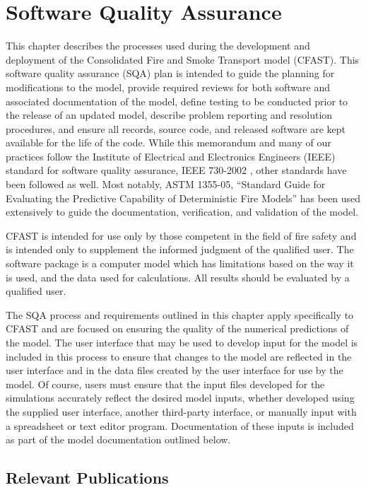 
\chapter{Software Quality Assurance}

This chapter describes the processes used during the development and deployment of the Consolidated Fire and Smoke Transport model (CFAST).  This software quality assurance (SQA) plan is intended to guide the planning for modifications to the model, provide required reviews for both software and associated documentation of the model, define testing to be conducted prior to the release of an updated model, describe problem reporting and resolution procedures, and ensure all records, source code, and released software are kept available for the life of the code.  While this memorandum and many of our practices follow the Institute of Electrical and Electronics Engineers (IEEE) standard for software quality assurance, IEEE 730-2002 \cite{IEEE:730}, other standards have been followed as well.  Most notably, ASTM 1355-05, ``Standard Guide for Evaluating the Predictive Capability of Deterministic Fire Models'' \cite{ASTM:E1355} has been used extensively to guide the documentation, verification, and validation of the model.

CFAST is intended for use only by those competent in the field of fire safety and is intended only to supplement the informed judgment of the qualified user. The software package is a computer model which has limitations based on the way it is used, and the data used for calculations. All results should be evaluated by a qualified user.

The SQA process and requirements outlined in this chapter apply specifically to CFAST and are focused on ensuring the quality of the numerical predictions of the model.  The user interface that may be used to develop input for the model is included in this process to ensure that changes to the model are reflected in the user interface and in the data files created by the user interface for use by the model.  Of course, users must ensure that the input files developed for the simulations accurately reflect the desired model inputs, whether developed using the supplied user interface, another third-party interface, or manually input with a spreadsheet or text editor program.  Documentation of these inputs is included as part of the model documentation outlined below.

\section{Relevant Publications}


